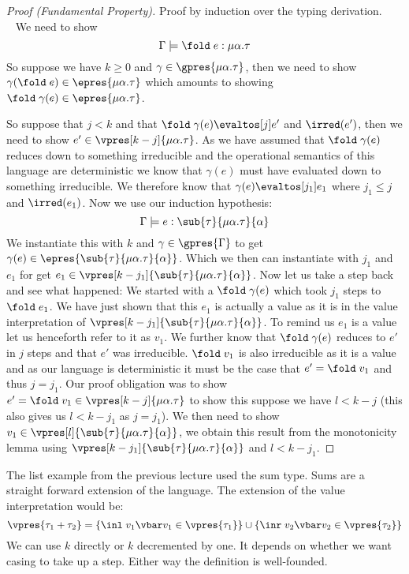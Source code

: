 \begin{proof}[Proof (Fundamental Property)]
Proof by induction over the typing derivation.
\case{\TFold} \\~
We need to show
\newcommand{\mat}{\ensuremath{\mu\alpha.\tau}}
\[
  \Gamma \models \fold \; e : \mat
\]
So suppose we have $k \geq 0$ and $\gamma \in \gpres{\mat}$, then we need to show $\gamma(\fold\; e) \in \epres{\mat}$ which amounts to showing $\fold\; \gamma(e) \in \epres{\mat}$.

So suppose that $j<k$ and that $\fold\; \gamma(e) \evaltos[j] e'$ and $\irred(e')$, then we need to show $e' \in \vpres[k-j]{\mat}$. As we have assumed that $\fold\; \gamma(e)$ reduces down to something irreducible and the operational semantics of this language are deterministic we know that $\gamma(e)$ must have evaluated down to something irreducible. We therefore know that $\gamma(e) \evaltos[j_1] e_1$ where $j_1 \leq j$ and $\irred(e_1)$.
Now we use our induction hypothesis:
\newcommand{\tsub}{\ensuremath{\sub{\tau}{\mat}{\alpha}}}
\[
  \Gamma \models e : \tsub
\]
We instantiate this with $k$ and $\gamma \in \gpres{\Gamma}$ to get $\gamma(e) \in \epres{\tsub}$. Which we then can instantiate with $j_1$ and $e_1$ for get $e_1 \in \vpres[k-j_1]{\tsub}$. Now let us take a step back and see what happened: We started with a $\fold\; \gamma(e)$ which took $j_1$ steps to $\fold\; e_1$. We have just shown that this $e_1$ is actually a value as it is in the value interpretation of $\vpres[k-j_1]{\tsub}$. To remind us $e_1$ is a value let us henceforth refer to it as $v_1$. We further know that $\fold\; \gamma(e)$ reduces to $e'$ in $j$ steps and that $e'$ was irreducible. $\fold\; v_1$ is also irreducible as it is a value and as our language is deterministic it must be the case that $e' = \fold\; v_1$ and thus $j = j_1$. Our proof obligation was to show $e' = \fold \; v_1 \in \vpres[k-j]{\mat}$ to show this suppose we have $l < k-j$ (this also gives us $l < k-j_1$ as $j = j_1$). We then need to show $v_1 \in \vpres[l]{\tsub}$, we obtain this result from the monotonicity lemma using $\vpres[k-j_1]{\tsub}$ and $l < k-j_1$.
\end{proof}

The list example from the previous lecture used the sum type. Sums are a straight forward extension of the language. The extension of the value interpretation would be:
\[
  \vpres{\tau_1 + \tau_2} = \{\inl \; v_1 \vbar v_1 \in \vpres{\tau_1}\} \cup
                            \{\inr \; v_2 \vbar v_2 \in \vpres{\tau_2}\}
\]
We can use $k$ directly or $k$ decremented by one. It depends on whether we want casing to take up a step. Either way the definition is well-founded.

